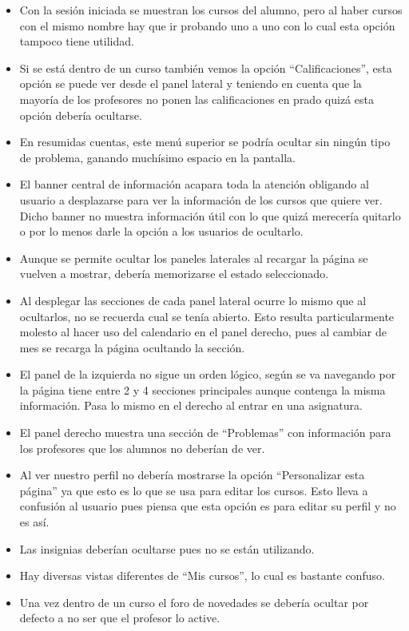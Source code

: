 \begin{itemize}
\item Con la sesión iniciada se muestran los cursos del alumno, pero al haber cursos con el mismo nombre hay que ir probando uno a uno con lo cual esta opción tampoco tiene utilidad.
\item Si se está dentro de un curso también vemos la opción ``Calificaciones'', esta opción se puede ver desde el panel lateral y teniendo en cuenta que la mayoría de los profesores no ponen las calificaciones en prado quizá esta opción debería ocultarse.
\item En resumidas cuentas, este menú superior se podría ocultar sin ningún tipo de problema, ganando muchísimo espacio en la pantalla.
\item El banner central de información acapara toda la atención obligando al usuario a desplazarse para ver la información de los cursos que quiere ver. Dicho banner no muestra información útil con lo que quizá merecería quitarlo o por lo menos darle la opción a los usuarios de ocultarlo.
\item Aunque se permite ocultar los paneles laterales al recargar la página se vuelven a mostrar, debería memorizarse el estado seleccionado.
\item Al desplegar las secciones de cada panel lateral ocurre lo mismo que al ocultarlos, no se recuerda cual se tenía abierto. Esto resulta particularmente molesto al hacer uso del calendario en el panel derecho, pues al cambiar de mes se recarga la página ocultando la sección.
\item El panel de la izquierda no sigue un orden lógico, según se va navegando por la página tiene entre 2 y 4 secciones principales aunque contenga la misma información. Pasa lo mismo en el derecho al entrar en una asignatura.
\item El panel derecho muestra una sección de ``Problemas'' con información para los profesores que los alumnos no deberían de ver.
\item Al ver nuestro perfil no debería mostrarse la opción ``Personalizar esta página'' ya que esto es lo que se usa para editar los cursos. Esto lleva a confusión al usuario pues piensa que esta opción es para editar su perfil y no es así.
\item Las insignias deberían ocultarse pues no se están utilizando.
\item Hay diversas vistas diferentes de ``Mis cursos'', lo cual es bastante confuso.
\item Una vez dentro de un curso el foro de novedades se debería ocultar por defecto a no ser que el profesor lo active.

\end{itemize}
